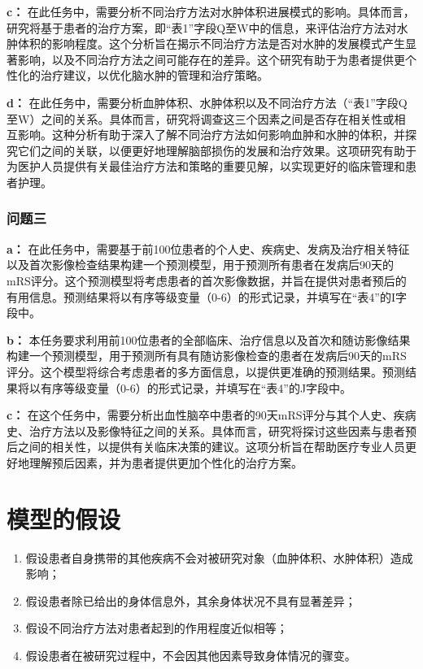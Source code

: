 \documentclass[bwprint]{gmcmthesis}
\begin{document}
\textbf{c：} 在此任务中，需要分析不同治疗方法对水肿体积进展模式的影响。具体而言，研究将基于患者的治疗方案，即“表1”字段Q至W中的信息，来评估治疗方法对水肿体积的影响程度。这个分析旨在揭示不同治疗方法是否对水肿的发展模式产生显著影响，以及不同治疗方法之间可能存在的差异。这个研究有助于为患者提供更个性化的治疗建议，以优化脑水肿的管理和治疗策略。


\textbf{d：} 在此任务中，需要分析血肿体积、水肿体积以及不同治疗方法（“表1”字段Q至W）之间的关系。具体而言，研究将调查这三个因素之间是否存在相关性或相互影响。这种分析有助于深入了解不同治疗方法如何影响血肿和水肿的体积，并探究它们之间的关联，以便更好地理解脑部损伤的发展和治疗效果。这项研究有助于为医护人员提供有关最佳治疗方法和策略的重要见解，以实现更好的临床管理和患者护理。


\subsubsection{问题三}
\textbf{a：} 在此任务中，需要基于前100位患者的个人史、疾病史、发病及治疗相关特征以及首次影像检查结果构建一个预测模型，用于预测所有患者在发病后90天的mRS评分。这个预测模型将考虑患者的首次影像数据，并旨在提供对患者预后的有用信息。预测结果将以有序等级变量（0-6）的形式记录，并填写在“表4”的I字段中。


\textbf{b：} 本任务要求利用前100位患者的全部临床、治疗信息以及首次和随访影像结果构建一个预测模型，用于预测所有具有随访影像检查的患者在发病后90天的mRS评分。这个模型将综合考虑患者的多方面信息，以提供更准确的预测结果。预测结果将以有序等级变量（0-6）的形式记录，并填写在“表4”的J字段中。


\textbf{c：} 在这个任务中，需要分析出血性脑卒中患者的90天mRS评分与其个人史、疾病史、治疗方法以及影像特征之间的关系。具体而言，研究将探讨这些因素与患者预后之间的相关性，以提供有关临床决策的建议。这项分析旨在帮助医疗专业人员更好地理解预后因素，并为患者提供更加个性化的治疗方案。



\clearpage
\section{模型的假设}

\begin{enumerate}
\item 假设患者自身携带的其他疾病不会对被研究对象（血肿体积、水肿体积）造成影响；
\item 假设患者除已给出的身体信息外，其余身体状况不具有显著差异；
\item 假设不同治疗方法对患者起到的作用程度近似相等；
\item 假设患者在被研究过程中，不会因其他因素导致身体情况的骤变。
\end{enumerate}
\end{document}
